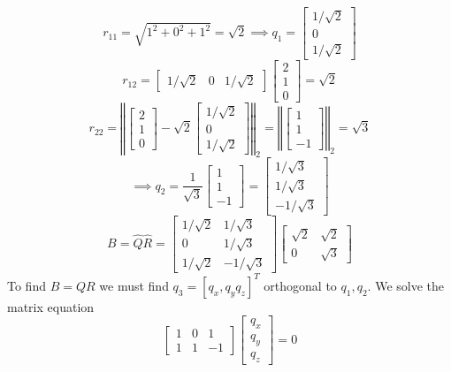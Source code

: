 \documentclass[12pt]{article}
\numberwithin{equation}{section}
\newcommand{\norm}[1]{\left\Vert#1\right\Vert}
\begin{document}
\begin{enumerate}
\begin{enumerate}
        $$r_{11}=\sqrt{1^2+0^2+1^2}=\sqrt{2}\implies q_1=\left[\begin{array}{c}1/\sqrt{2}\\0\\1/\sqrt{2}\end{array}\right]$$
        $$r_{12}=\left[\begin{array}{ccc}1/\sqrt{2}&0&1/\sqrt{2}\end{array}\right]\left[\begin{array}{c}2\\1\\0\end{array}\right]=\sqrt{2}$$
        $$r_{22}=\norm{\left[\begin{array}{c}2\\1\\0\end{array}\right]-\sqrt{2}\left[\begin{array}{c}1/\sqrt{2}\\0\\1/\sqrt{2}\end{array}\right]}_2=\norm{\left[\begin{array}{c}1\\1\\-1\end{array}\right]}_2=\sqrt{3}$$
        $$\implies q_2=\frac{1}{\sqrt{3}}\left[\begin{array}{c}1\\1\\-1\end{array}\right]=\left[\begin{array}{c}1/\sqrt{3}\\1/\sqrt{3}\\-1/\sqrt{3}\end{array}\right]$$
        $$B=\hat{Q}\hat{R}=\left[\begin{array}{cc}1/\sqrt{2}&1/\sqrt{3}\\0&1/\sqrt{3}\\1/\sqrt{2}&-1/\sqrt{3}\end{array}\right]\left[\begin{array}{cc}\sqrt{2}&\sqrt{2}\\0&\sqrt{3}\end{array}\right]$$
        To find $B=QR$ we must find $q_3=[q_x,q_yq_z]^T$ orthogonal to $q_1,q_2$. We solve the matrix equation
        $$\left[\begin{array}{ccc}1&0&1\\1&1&-1\end{array}\right]\left[\begin{array}{c}q_x\\q_y\\q_z\end{array}\right]=0$$

\end{enumerate}
\end{enumerate}
\end{document}
